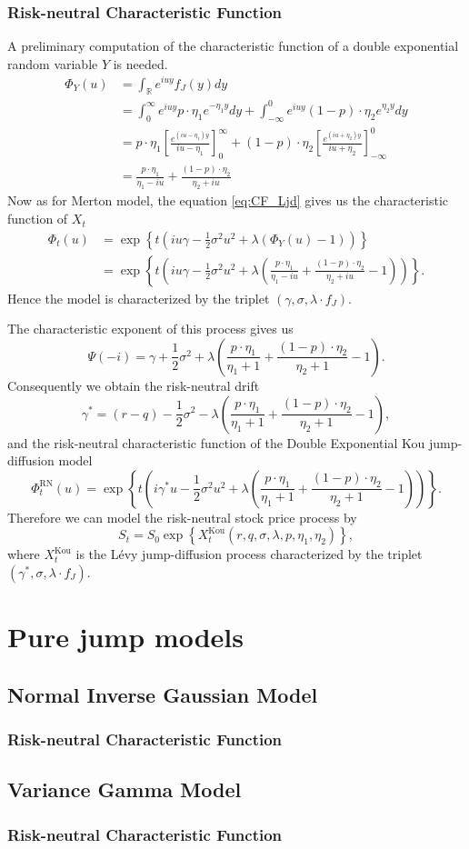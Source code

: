 \subsubsection*{Risk-neutral Characteristic Function}
A preliminary computation of the characteristic function of a double exponential random variable $Y$ is needed.
\begin{align*}
\Phi_Y(u)&=\int_\mathbb{R} e^{iuy}f_J(y) dy\\
&=\int_0^\infty e^{iuy}p\cdot \eta_1e^{-\eta_1 y}dy + \int_{-\infty}^0e^{iuy}(1-p)\cdot\eta_2e^{\eta_2 y}dy\\
&= p\cdot\eta_1\left[\frac{e^{(iu-\eta_1)y}}{iu-\eta_1}\right]_0^\infty+(1-p)\cdot\eta_2\left[\frac{e^{(iu+\eta_2)y}}{iu+\eta_2}\right]_{-\infty}^0\\
&=\frac{p\cdot\eta_1}{\eta_1-iu}+\frac{(1-p)\cdot\eta_2}{\eta_2+iu}
\end{align*}
Now as for Merton model, the equation \eqref{eq:CF_Ljd} gives us the characteristic function of $X_t$
\begin{align*}
\Phi_t(u)&=\exp\left\{t\left(iu\gamma-\frac{1}{2}\sigma^2 u^2 + \lambda\left(\Phi_Y(u)-1\right)\right)\right\}\\
&=\exp\left\{t\left(iu\gamma -\frac{1}{2}\sigma^2u^2 + \lambda\left(\frac{p\cdot\eta_1}{\eta_1-iu}+\frac{(1-p)\cdot\eta_2}{\eta_2+iu}-1\right)\right)\right\}.
\end{align*}
Hence the model is characterized by the triplet $(\gamma,\sigma,\lambda\cdot f_J)$.

The characteristic exponent of this process gives us
$$\Psi(-i) = \gamma + \frac{1}{2}\sigma^2 +\lambda \left(\frac{p\cdot\eta_1}{\eta_1+1}+\frac{(1-p)\cdot\eta_2}{\eta_2+1}-1\right).$$
Consequently we obtain the risk-neutral drift
$$\gamma^\ast = (r-q)- \frac{1}{2}\sigma^2 -\lambda \left(\frac{p\cdot\eta_1}{\eta_1+1}+\frac{(1-p)\cdot\eta_2}{\eta_2+1}-1\right),$$
and the risk-neutral characteristic function of the Double Exponential Kou jump-diffusion model
$$\Phi_t^\text{RN}(u)=\exp\left\{t\left(i\gamma^\ast u -\frac{1}{2}\sigma^2 u^2 +\lambda\left(\frac{p\cdot\eta_1}{\eta_1+1}+\frac{(1-p)\cdot\eta_2}{\eta_2+1}-1\right)\right)\right\}.$$
Therefore we can model the risk-neutral stock price process by
$$S_t=S_0\exp\left\{X_t^\text{Kou}(r,q,\sigma,\lambda,p,\eta_1,\eta_2)\right\},$$
where $X_t^\text{Kou}$ is the L\'evy jump-diffusion process characterized by the triplet $(\gamma^\ast,\sigma,\lambda\cdot f_J)$.

\section{Pure jump models}
\label{sec:models:pure_jump}

\subsection{Normal Inverse Gaussian Model}
\subsubsection*{Risk-neutral Characteristic Function}
\subsection{Variance Gamma Model}
\subsubsection*{Risk-neutral Characteristic Function}